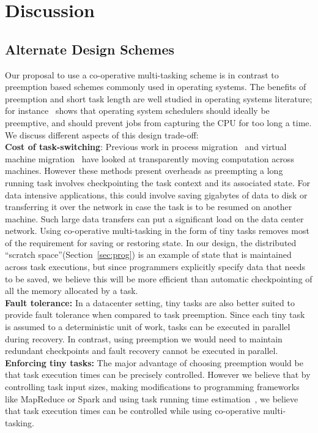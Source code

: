 \section{Discussion}

\subsection{Alternate Design Schemes}
\label{sec:alternate}
Our proposal to use a co-operative multi-tasking scheme is in contrast to
preemption based schemes commonly used in operating systems. The benefits of 
preemption and short task length are well studied in operating
systems literature; for instance~\cite{sherman1972trace} shows that operating
system schedulers should ideally be preemptive, and should prevent jobs from
capturing the CPU for too long a time. We discuss different aspects of this
design trade-off:\\
\textbf{Cost of task-switching}: Previous work in process
migration~\cite{douglis1991transparent,milojivcic2000process} and virtual
machine migration~\cite{xen-vm-move} have looked at transparently moving
computation across machines. However these methods present overheads as
preempting a long running task involves checkpointing the task context and its
associated state. For data intensive applications, this could involve saving
gigabytes of data to disk or transferring it over the network in case the task
is to be resumed on another machine. Such large data transfers can put a
significant load on the data center network. Using co-operative multi-tasking in
the form of tiny tasks removes most of the requirement for saving or restoring
state.  In our design, the distributed ``scratch space''(Section~\ref{sec:prog})
is an example of state that is maintained across task executions, but since
programmers explicitly specify data that needs to be saved, we believe this will
be more efficient than automatic checkpointing of all the memory allocated by a
task.\\ 
\textbf{Fault tolerance:} In a datacenter setting, tiny tasks are also better suited to provide fault
tolerance when compared to task preemption. Since each tiny task is assumed to a
deterministic unit of work, tasks can be executed in parallel during recovery.
In contrast, using preemption we would need to maintain redundant checkpoints
and fault recovery cannot be executed in parallel. \\
\textbf{Enforcing tiny tasks:} The major advantage of choosing preemption would be that task execution times
can be precisely controlled. However we believe that by controlling task input
sizes, making modifications to programming frameworks like MapReduce or 
Spark and using task running time estimation~\cite{something}, we believe that
task execution times can be controlled while using co-operative multi-tasking. 

